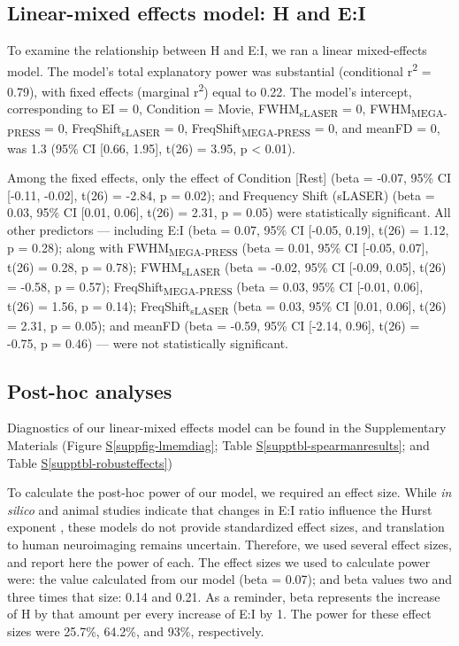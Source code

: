 \documentclass[
true
]{sn-jnl}
\newcommand*\quartosuppfigref[1]{Figure \hyperref[#1]{S\ref{#1}}}
\newcommand*\quartosupptblref[1]{Table \hyperref[#1]{S\ref{#1}}}
\begin{document}
\subsection{Linear-mixed effects model: H and
E:I}\label{linear-mixed-effects-model-h-and-ei}

To examine the relationship between H and E:I, we ran a linear
mixed-effects model. The model's total explanatory power was substantial
(conditional r\textsuperscript{2} = 0.79), with fixed effects (marginal
r\textsuperscript{2}) equal to 0.22. The model's intercept,
corresponding to EI = 0, Condition = Movie, FWHM\textsubscript{sLASER} =
0, FWHM\textsubscript{MEGA-PRESS} = 0, FreqShift\textsubscript{sLASER} =
0, FreqShift\textsubscript{MEGA-PRESS} = 0, and meanFD = 0, was 1.3
(95\% CI {[}0.66, 1.95{]}, t(26) = 3.95, p \textless{} 0.01).

Among the fixed effects, only the effect of Condition {[}Rest{]} (beta =
-0.07, 95\% CI {[}-0.11, -0.02{]}, t(26) = -2.84, p = 0.02); and
Frequency Shift (sLASER) (beta = 0.03, 95\% CI {[}0.01, 0.06{]}, t(26) =
2.31, p = 0.05) were statistically significant. All other predictors ---
including E:I (beta = 0.07, 95\% CI {[}-0.05, 0.19{]}, t(26) = 1.12, p =
0.28); along with FWHM\textsubscript{MEGA-PRESS} (beta = 0.01, 95\% CI
{[}-0.05, 0.07{]}, t(26) = 0.28, p = 0.78); FWHM\textsubscript{sLASER}
(beta = -0.02, 95\% CI {[}-0.09, 0.05{]}, t(26) = -0.58, p = 0.57);
FreqShift\textsubscript{MEGA-PRESS} (beta = 0.03, 95\% CI {[}-0.01,
0.06{]}, t(26) = 1.56, p = 0.14); FreqShift\textsubscript{sLASER} (beta
= 0.03, 95\% CI {[}0.01, 0.06{]}, t(26) = 2.31, p = 0.05); and meanFD
(beta = -0.59, 95\% CI {[}-2.14, 0.96{]}, t(26) = -0.75, p = 0.46) ---
were not statistically significant.

\subsection{Post-hoc analyses}\label{post-hoc-analyses}

Diagnostics of our linear-mixed effects model can be found in the
Supplementary Materials (\quartosuppfigref{suppfig-lmemdiag};
\quartosupptblref{supptbl-spearmanresults}; and
\quartosupptblref{supptbl-robusteffects})

To calculate the post-hoc power of our model, we required an effect
size. While \emph{in silico} and animal studies indicate that changes in
E:I ratio influence the Hurst exponent
\citep{trakoshisIntrinsicExcitationinhibitionImbalance}, these models do
not provide standardized effect sizes, and translation to human
neuroimaging remains uncertain. Therefore, we used several effect sizes,
and report here the power of each. The effect sizes we used to calculate
power were: the value calculated from our model (beta = 0.07); and beta
values two and three times that size: 0.14 and 0.21. As a reminder, beta
represents the increase of H by that amount per every increase of E:I by
1. The power for these effect sizes were 25.7\%, 64.2\%, and 93\%,
respectively.
\end{document}
